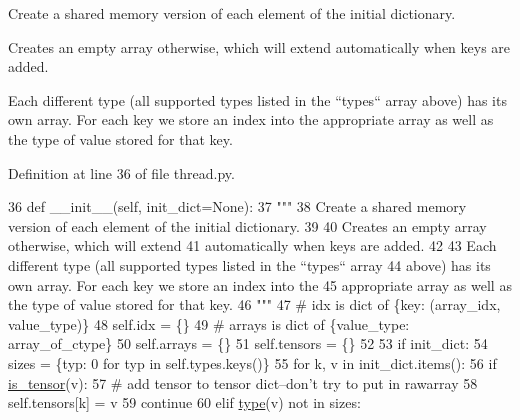 \begin{DoxyVerb}Create a shared memory version of each element of the initial dictionary.

Creates an empty array otherwise, which will extend
automatically when keys are added.

Each different type (all supported types listed in the ``types`` array
above) has its own array. For each key we store an index into the
appropriate array as well as the type of value stored for that key.
\end{DoxyVerb}
 

Definition at line 36 of file thread.\+py.


\begin{DoxyCode}
36     \textcolor{keyword}{def }\_\_init\_\_(self, init\_dict=None):
37         \textcolor{stringliteral}{"""}
38 \textcolor{stringliteral}{        Create a shared memory version of each element of the initial dictionary.}
39 \textcolor{stringliteral}{}
40 \textcolor{stringliteral}{        Creates an empty array otherwise, which will extend}
41 \textcolor{stringliteral}{        automatically when keys are added.}
42 \textcolor{stringliteral}{}
43 \textcolor{stringliteral}{        Each different type (all supported types listed in the ``types`` array}
44 \textcolor{stringliteral}{        above) has its own array. For each key we store an index into the}
45 \textcolor{stringliteral}{        appropriate array as well as the type of value stored for that key.}
46 \textcolor{stringliteral}{        """}
47         \textcolor{comment}{# idx is dict of \{key: (array\_idx, value\_type)\}}
48         self.idx = \{\}
49         \textcolor{comment}{# arrays is dict of \{value\_type: array\_of\_ctype\}}
50         self.arrays = \{\}
51         self.tensors = \{\}
52 
53         \textcolor{keywordflow}{if} init\_dict:
54             sizes = \{typ: 0 \textcolor{keywordflow}{for} typ \textcolor{keywordflow}{in} self.types.keys()\}
55             \textcolor{keywordflow}{for} k, v \textcolor{keywordflow}{in} init\_dict.items():
56                 \textcolor{keywordflow}{if} \hyperlink{namespaceparlai_1_1utils_1_1thread_ad2b01da95ecdc33d8dce76a79f48137f}{is\_tensor}(v):
57                     \textcolor{comment}{# add tensor to tensor dict--don't try to put in rawarray}
58                     self.tensors[k] = v
59                     \textcolor{keywordflow}{continue}
60                 \textcolor{keywordflow}{elif} \hyperlink{namespaceparlai_1_1agents_1_1tfidf__retriever_1_1build__tfidf_ad5dfae268e23f506da084a9efb72f619}{type}(v) \textcolor{keywordflow}{not} \textcolor{keywordflow}{in} sizes:

\end{DoxyCode}
